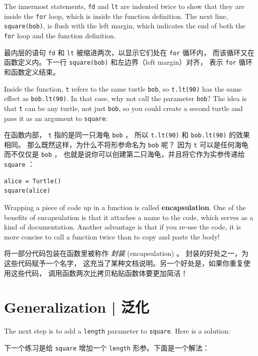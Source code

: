 %
The innermost statements, {\tt fd} and {\tt lt} are indented twice to
show that they are inside the {\tt for} loop, which is inside the
function definition.  The next line, {\tt square(bob)}, is flush with
the left margin, which indicates the end of both the {\tt for} loop
and the function definition.

最内层的语句 \lstinline{fd} 和 \lstinline{lt} 被缩进两次，以显示它们处在 \lstinline{for} 循环内， 而该循环又在函数定义内。下一行 \lstinline{square(bob)} 和左边界（left margin）对齐， 表示 \lstinline{for} 循环和函数定义结束。

Inside the function, {\tt t} refers to the same turtle {\tt bob}, so
{\tt t.lt(90)} has the same effect as {\tt bob.lt(90)}.  In that
case, why not
call the parameter {\tt bob}?  The idea is that {\tt t} can be any
turtle, not just {\tt bob}, so you could create a second turtle and
pass it as an argument to {\tt square}:

在函数内部， \lstinline{t} 指的是同一只海龟 \lstinline{bob} ， 所以 \lstinline{t.lt(90)} 和 \lstinline{bob.lt(90)} 的效果相同。
那么既然这样，为什么不将形参命名为 \lstinline{bob} 呢？ 因为 \lstinline{t} 可以是任何海龟而不仅仅是 \lstinline{bob} ，
也就是说你可以创建第二只海龟，并且将它作为实参传递给 \lstinline{square} ：

\begin{lstlisting}
alice = Turtle()
square(alice)
\end{lstlisting}

%
Wrapping a piece of code up in a function is called {\bf
encapsulation}.  One of the benefits of encapsulation is that it
attaches a name to the code, which serves as a kind of documentation.
Another advantage is that if you re-use the code, it is more concise
to call a function twice than to copy and paste the body!

将一部分代码包装在函数里被称作 \emph{封装} (encapsulation) 。
封装的好处之一，为这些代码赋予一个名字，
这充当了某种文档说明。另一个好处是，如果你重复使用这些代码，
调用函数两次比拷贝粘贴函数体要更加简洁！


\section{Generalization  |  泛化}

The next step is to add a {\tt length} parameter to {\tt square}.
Here is a solution:

下一个练习是给 \lstinline{square} 增加一个 \lstinline{length} 形参。下面是一个解法：

